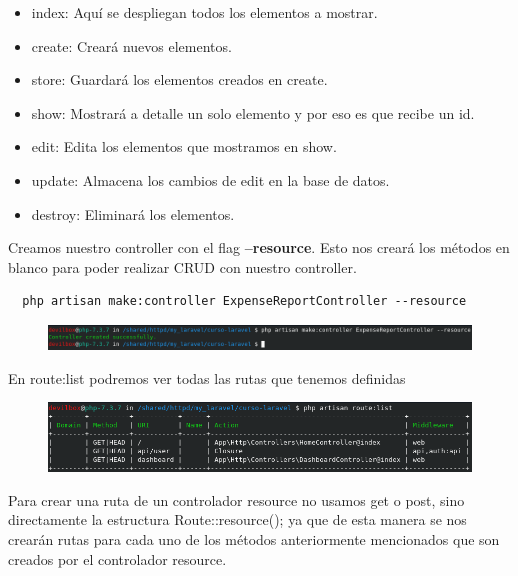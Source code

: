 \documentclass{article}
\begin{document}
\begin{itemize}
  \item index: Aquí se despliegan todos los elementos a mostrar.
  \item create: Creará nuevos elementos.
  \item store: Guardará los elementos creados en create.
  \item show: Mostrará a detalle un solo elemento y por eso es que recibe un id.
  \item edit: Edita los elementos que mostramos en show.
  \item update: Almacena los cambios de edit en la base de datos.
  \item destroy: Eliminará los elementos.
\end{itemize}

Creamos nuestro controller con el flag \textbf{--resource}. Esto nos creará los
métodos en blanco para poder realizar CRUD con nuestro controller.\\

\begin{verbatim}
  php artisan make:controller ExpenseReportController --resource
\end{verbatim}

\begin{figure}[h!]
  \centering
  \includegraphics[scale=0.5]{./Pictures/049_controller_resource.png}
\end{figure}

En route:list podremos ver todas las rutas que tenemos definidas\\

\begin{figure}[h!]
  \centering
  \includegraphics[scale=0.5]{./Pictures/050_route_list.png}
\end{figure}

Para crear una ruta de un controlador resource no usamos get o post, sino
directamente la estructura Route::resource(); ya que de esta manera se nos
crearán rutas para cada uno de los métodos anteriormente mencionados que son
creados por el controlador resource.
\end{document}
